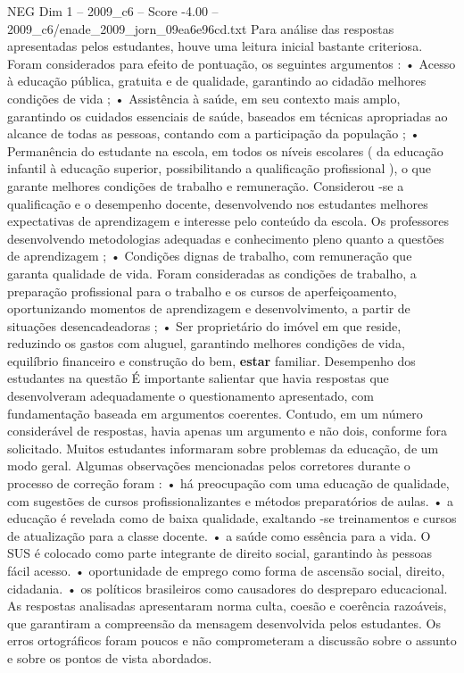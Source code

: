 \begin{textsample}{NEG Dim 1 – 2009\_c6 – Score -4.00 – 2009\_c6/enade\_2009\_jorn\_09ea6e96cd.txt}
Para análise das respostas apresentadas pelos estudantes, houve uma leitura inicial bastante criteriosa.
Foram considerados para efeito de pontuação, os seguintes argumentos : • Acesso à educação pública, gratuita e de qualidade, garantindo ao cidadão melhores condições de vida ; • Assistência à saúde, em seu contexto mais amplo, garantindo os cuidados essenciais de saúde, baseados em técnicas apropriadas ao alcance de todas as pessoas, contando com a participação da população ; • Permanência do estudante na escola, em todos os níveis escolares ( da educação infantil à educação superior, possibilitando a qualificação profissional ), o que garante melhores condições de trabalho e remuneração.
Considerou -se a qualificação e o desempenho docente, desenvolvendo nos estudantes melhores expectativas de aprendizagem e interesse pelo conteúdo da escola.
Os professores desenvolvendo metodologias adequadas e conhecimento pleno quanto a questões de aprendizagem ; • Condições dignas de trabalho, com remuneração que garanta qualidade de vida.
Foram consideradas as condições de trabalho, a preparação profissional para o trabalho e os cursos de aperfeiçoamento, oportunizando momentos de aprendizagem e desenvolvimento, a partir de situações desencadeadoras ; • Ser proprietário do imóvel em que reside, reduzindo os gastos com aluguel, garantindo melhores condições de vida, equilíbrio financeiro e construção do bem, \textbf{estar} familiar.
Desempenho dos estudantes na questão É importante salientar que havia respostas que desenvolveram adequadamente o questionamento apresentado, com fundamentação baseada em argumentos coerentes.
Contudo, em um número considerável de respostas, havia apenas um argumento e não dois, conforme fora solicitado.
Muitos estudantes informaram sobre problemas da educação, de um modo geral.
Algumas observações mencionadas pelos corretores durante o processo de correção foram : • há preocupação com uma educação de qualidade, com sugestões de cursos profissionalizantes e métodos preparatórios de aulas. • a educação é revelada como de baixa qualidade, exaltando -se treinamentos e cursos de atualização para a classe docente. • a saúde como essência para a vida.
O SUS é colocado como parte integrante de direito social, garantindo às pessoas fácil acesso. • oportunidade de emprego como forma de ascensão social, direito, cidadania. • os políticos brasileiros como causadores do despreparo educacional.
As respostas analisadas apresentaram norma culta, coesão e coerência razoáveis, que garantiram a compreensão da mensagem desenvolvida pelos estudantes.
Os erros ortográficos foram poucos e não comprometeram a discussão sobre o assunto e sobre os pontos de vista abordados.

\end{textsample}
